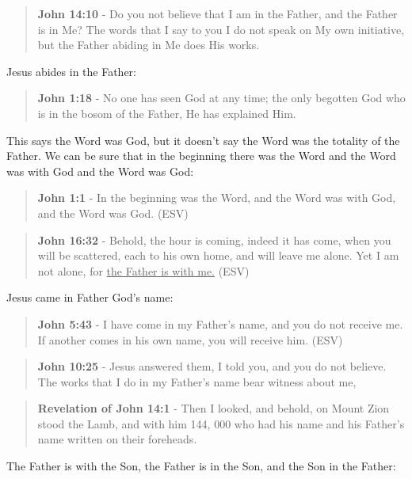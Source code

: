 \documentclass[11pt]{article}
\begin{document}
\begin{quote}
\textbf{John 14:10} - Do you not believe that I am in the Father, and the Father is in Me? The words that I say to you I do not speak on My own initiative, but the Father abiding in Me does His works.
\end{quote}

Jesus abides in the Father:

\begin{quote}
\textbf{John 1:18} - No one has seen God at any time; the only begotten God who is in the bosom of the Father, He has explained Him.
\end{quote}

This says the Word was God, but it doesn't say the Word was the totality of the Father. We can be sure that in the beginning there was the Word and the Word was with God and the Word was God:

\begin{quote}
\textbf{John 1:1} - In the beginning was the Word, and the Word was with God, and the Word was God. (ESV)
\end{quote}

\begin{quote}
\textbf{John 16:32} - Behold, the hour is coming, indeed it has come, when you will be scattered, each to his own home, and will leave me alone. Yet I am not alone, for \uline{the Father is with me.} (ESV)
\end{quote}

Jesus came in Father God's name:

\begin{quote}
\textbf{John 5:43} - I have come in my Father's name, and you do not receive me. If another comes in his own name, you will receive him. (ESV)
\end{quote}

\begin{quote}
\textbf{John 10:25} - Jesus answered them, I told you, and you do not believe. The works that I do in my Father's name bear witness about me,
\end{quote}

\begin{quote}
\textbf{Revelation of John 14:1} - Then I looked, and behold, on Mount Zion stood the Lamb, and with him 144, 000 who had his name and his Father's name written on their foreheads.
\end{quote}

The Father is with the Son, the Father is in the Son, and the Son in the Father:
\end{document}
